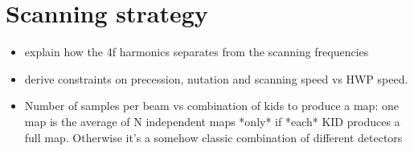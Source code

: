 
\section{Scanning strategy}

\begin{itemize}
\item explain how the 4f harmonics separates from the scanning frequencies
\item derive constraints on precession, nutation and scanning speed vs HWP
  speed.
\item Number of samples per beam vs combination of kids to produce a map: one
  map is the average of N independent maps *only* if *each* KID produces a full
  map. Otherwise it's a somehow classic combination of different detectors
\end{itemize}


